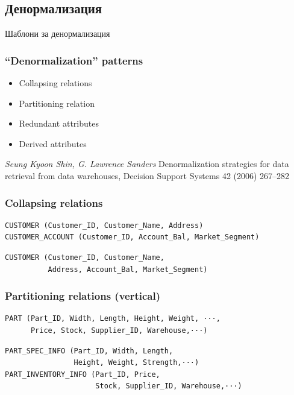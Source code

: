 \documentclass{beamer}
\begin{document}
\subsection{Денормализация}

\begin{frame}
\centerline{Шаблони за денормализация}
\end{frame}


\begin{frame}[fragile]
\frametitle{``Denormalization'' patterns}


\begin{itemize}
  \item Collapsing relations
  \item Partitioning relation
  \item Redundant attributes
  \item Derived attributes
\end{itemize}

\vspace{\baselineskip}
\vspace{\baselineskip}

\textit {Seung Kyoon Shin, G. Lawrence Sanders} Denormalization strategies for data retrieval from data warehouses, Decision Support Systems 42 (2006) 267–282

\end{frame}


\begin{frame}[fragile]
\frametitle{Collapsing relations}

\begin{verbatim}
CUSTOMER (Customer_ID, Customer_Name, Address) 
CUSTOMER_ACCOUNT (Customer_ID, Account_Bal, Market_Segment)  
\end{verbatim}

\vspace{\baselineskip}

\begin{verbatim}
CUSTOMER (Customer_ID, Customer_Name, 
          Address, Account_Bal, Market_Segment)
\end{verbatim}

\end{frame}


\begin{frame}[fragile]
\frametitle{Partitioning relations (vertical)}


\begin{verbatim}
PART (Part_ID, Width, Length, Height, Weight, ···, 
      Price, Stock, Supplier_ID, Warehouse,···)
\end{verbatim}

\vspace{\baselineskip}

\begin{verbatim}
PART_SPEC_INFO (Part_ID, Width, Length, 
                Height, Weight, Strength,···)
PART_INVENTORY_INFO (Part_ID, Price, 
                     Stock, Supplier_ID, Warehouse,···)
\end{verbatim}

\end{frame}
\end{document}
